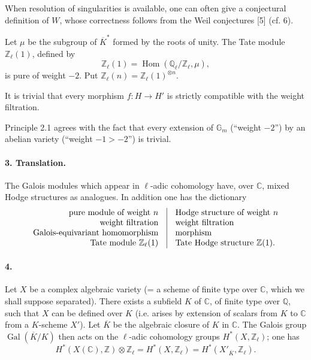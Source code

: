 \documentclass[10pt]{article}
\newcommand{\C}{\mathbb C}
\newcommand{\Q}{\mathbb Q}
\newcommand{\Z}{\mathbb Z}
\newcommand{\Ql}{\mathbb Q_\ell}
\newcommand{\Zl}{\mathbb Z_\ell}
\newcommand{\Gm}{\mathbb G_m}
\newcommand{\Gal}{\operatorname{Gal}}
\newcommand{\Hom}{\operatorname{Hom}}
\newcommand{\barK}{\overline{K}}
\begin{document}
When resolution of singularities is available, one can often give a conjectural definition of $W$, whose correctness follows from the Weil conjectures [5] (cf. 6).

Let $\mu$ be the subgroup of $\barK^*$ formed by the roots of unity. The Tate module $\Zl(1)$, defined by
\[
\Zl(1)=\Hom(\Ql/\Zl,\mu),
\]
is pure of weight $-2$. Put $\Zl(n)=\Zl(1)^{\otimes n}$.

It is trivial that every morphism $f:H\to H'$ is strictly compatible with the weight filtration.

Principle 2.1 agrees with the fact that every extension of $\Gm$ (``weight $-2$'') by an abelian variety (``weight $-1>-2$'') is trivial.

\paragraph{3. Translation.} The Galois modules which appear in $\ell$-adic cohomology have, over $\C$, mixed Hodge structures as analogues. In addition one has the dictionary
\[
\begin{array}{r@{\quad\vrule\quad}l}
\text{pure module of weight }n & \text{Hodge structure of weight }n\\
\text{weight filtration} & \text{weight filtration}\\
\text{Galois-equivariant homomorphism} & \text{morphism}\\
\text{Tate module }\Zl(1) & \text{Tate Hodge structure }\Z(1).
\end{array}
\]

\paragraph{4.} Let $X$ be a complex algebraic variety (= a scheme of finite type over $\C$, which we shall suppose separated). There exists a subfield $K$ of $\C$, of finite type over $\Q$, such that $X$ can be defined over $K$ (i.e. arises by extension of scalars from $K$ to $\C$ from a $K$-scheme $X'$). Let $\barK$ be the algebraic closure of $K$ in $\C$. The Galois group $\Gal(\barK/K)$ then acts on the $\ell$-adic cohomology groups $H^*(X,\Zl)$; one has
\[
H^*(X(\C),\Z)\otimes\Zl=H^*(X,\Zl)=H^*(X'_{\barK},\Zl).
\]
\end{document}
